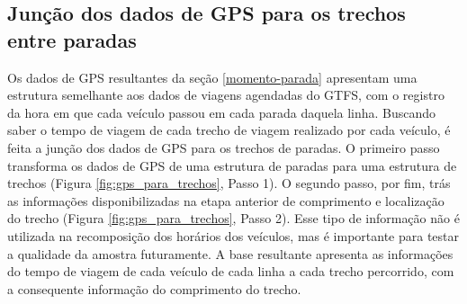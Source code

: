 \documentclass[        
    a4paper,          %
    12pt,             %
    chapter=TITLE,    %
    section=Title,    %
    subsection=Title, %
    oneside,          %
    english,          %
    spanish,          %
    brazil,           %
    fleqn             %
]{abntex2}
\begin{document}
  \begin{figure}[!h]
  \captionsetup{width=16cm}
  \centering
  \end{figure}
  
  \hypertarget{juncao-dos-dados-de-gps-para-os-trechos-entre-paradas}{%
  \subsection{Junção dos dados de GPS para os trechos entre paradas}\label{juncao-dos-dados-de-gps-para-os-trechos-entre-paradas}}
  
  Os dados de GPS resultantes da seção \ref{momento-parada} apresentam uma estrutura semelhante aos dados de viagens agendadas do GTFS, com o registro da hora em que cada veículo passou em cada parada daquela linha. Buscando saber o tempo de viagem de cada trecho de viagem realizado por cada veículo, é feita a junção dos dados de GPS para os trechos de paradas. O primeiro passo transforma os dados de GPS de uma estrutura de paradas para uma estrutura de trechos (Figura \ref{fig:gps_para_trechos}, Passo 1). O segundo passo, por fim, trás as informações disponibilizadas na etapa anterior de comprimento e localização do trecho (Figura \ref{fig:gps_para_trechos}, Passo 2). Esse tipo de informação não é utilizada na recomposição dos horários dos veículos, mas é importante para testar a qualidade da amostra futuramente. A base resultante apresenta as informações do tempo de viagem de cada veículo de cada linha a cada trecho percorrido, com a consequente informação do comprimento do trecho.
  
\end{document}
